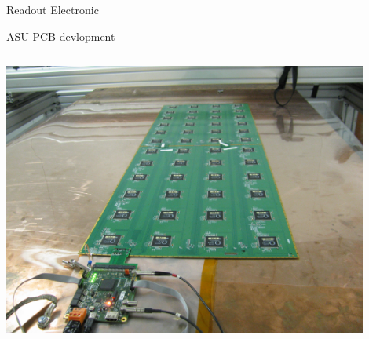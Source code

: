 \documentclass[10pt]{beamer}
\begin{document}
\begin{frame}[shrink=3]{Readout Electronic}
\begin{block}{ASU PCB devlopment}
\begin{columns}
      \begin{column}{0.5\textwidth}
         \centerline{\includegraphics[width=0.9\textwidth]{jpg/DIFAsu}}
      \end{column}

    \end{columns}
\end{block}
\end{frame}
\end{document}
